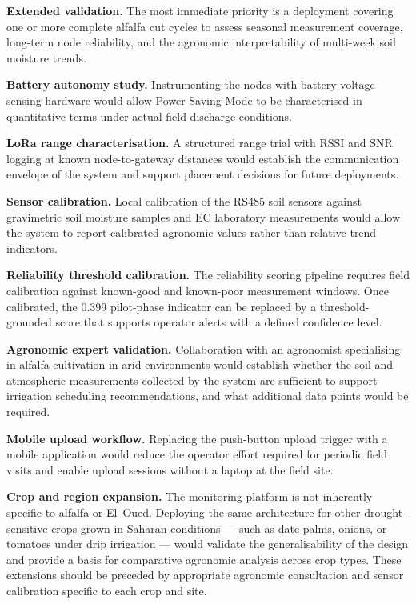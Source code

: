 \textbf{Extended validation.} The most immediate priority is a deployment covering
one or more complete alfalfa cut cycles to assess seasonal measurement coverage,
long-term node reliability, and the agronomic interpretability of multi-week
soil moisture trends.

\textbf{Battery autonomy study.} Instrumenting the nodes with battery voltage
sensing hardware would allow Power Saving Mode to be characterised in quantitative
terms under actual field discharge conditions.

\textbf{LoRa range characterisation.} A structured range trial with RSSI and SNR
logging at known node-to-gateway distances would establish the communication
envelope of the system and support placement decisions for future deployments.

\textbf{Sensor calibration.} Local calibration of the RS485 soil sensors against
gravimetric soil moisture samples and EC laboratory measurements would allow the
system to report calibrated agronomic values rather than relative trend indicators.

\textbf{Reliability threshold calibration.} The reliability scoring pipeline
requires field calibration against known-good and known-poor measurement windows.
Once calibrated, the 0.399 pilot-phase indicator can be replaced by a threshold-
grounded score that supports operator alerts with a defined confidence level.

\textbf{Agronomic expert validation.} Collaboration with an agronomist specialising
in alfalfa cultivation in arid environments would establish whether the soil and
atmospheric measurements collected by the system are sufficient to support
irrigation scheduling recommendations, and what additional data points would be
required.

\textbf{Mobile upload workflow.} Replacing the push-button upload trigger with a
mobile application would reduce the operator effort required for periodic field
visits and enable upload sessions without a laptop at the field site.

\textbf{Crop and region expansion.} The monitoring platform is not inherently
specific to alfalfa or El~Oued. Deploying the same architecture for other
drought-sensitive crops grown in Saharan conditions — such as date palms, onions,
or tomatoes under drip irrigation — would validate the generalisability of the
design and provide a basis for comparative agronomic analysis across crop types.
These extensions should be preceded by appropriate agronomic consultation and
sensor calibration specific to each crop and site.
